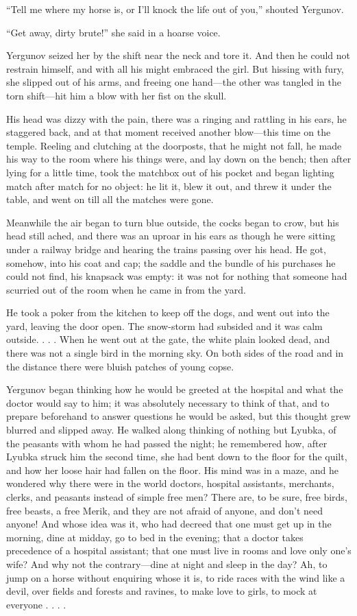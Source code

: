 “Tell me where my horse is, or I’ll knock the life out of you,” shouted
Yergunov.

“Get away, dirty brute!” she said in a hoarse voice.

Yergunov seized her by the shift near the neck and tore it. And then he
could not restrain himself, and with all his might embraced the girl.
But hissing with fury, she slipped out of his arms, and freeing one
hand—the other was tangled in the torn shift—hit him a blow with her
fist on the skull.

His head was dizzy with the pain, there was a ringing and rattling in
his ears, he staggered back, and at that moment received another
blow—this time on the temple. Reeling and clutching at the doorposts,
that he might not fall, he made his way to the room where his things
were, and lay down on the bench; then after lying for a little time,
took the matchbox out of his pocket and began lighting match after match
for no object: he lit it, blew it out, and threw it under the table, and
went on till all the matches were gone.

Meanwhile the air began to turn blue outside, the cocks began to crow,
but his head still ached, and there was an uproar in his ears as though
he were sitting under a railway bridge and hearing the trains passing
over his head. He got, somehow, into his coat and cap; the saddle and
the bundle of his purchases he could not find, his knapsack was empty:
it was not for nothing that someone had scurried out of the room when he
came in from the yard.

He took a poker from the kitchen to keep off the dogs, and went out into
the yard, leaving the door open. The snow-storm had subsided and it was
calm outside. . . . When he went out at the gate, the white plain looked
dead, and there was not a single bird in the morning sky. On both sides
of the road and in the distance there were bluish patches of young
copse.

Yergunov began thinking how he would be greeted at the hospital and what
the doctor would say to him; it was absolutely necessary to think of
that, and to prepare beforehand to answer questions he would be asked,
but this thought grew blurred and slipped away. He walked along thinking
of nothing but Lyubka, of the peasants with whom he had passed the
night; he remembered how, after Lyubka struck him the second time, she
had bent down to the floor for the quilt, and how her loose hair had
fallen on the floor. His mind was in a maze, and he wondered why there
were in the world doctors, hospital assistants, merchants, clerks, and
peasants instead of simple free men? There are, to be sure, free birds,
free beasts, a free Merik, and they are not afraid of anyone, and don’t
need anyone! And whose idea was it, who had decreed that one must get up
in the morning, dine at midday, go to bed in the evening; that a doctor
takes precedence of a hospital assistant; that one must live in rooms
and love only one’s wife? And why not the contrary—dine at night and
sleep in the day? Ah, to jump on a horse without enquiring whose it is,
to ride races with the wind like a devil, over fields and forests and
ravines, to make love to girls, to mock at everyone . . . .


